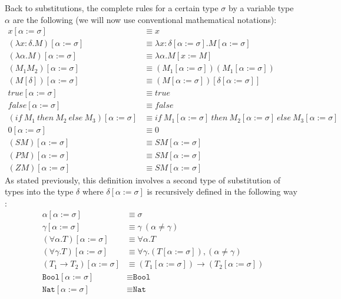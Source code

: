 \documentclass{article}
\begin{document}
    Back to substitutions, the complete rules for a certain type $\sigma$ by a variable type $\alpha$ are the following (we will now use conventional mathematical notations):
    \label{substitution2}\begin{align*}
            x[\alpha:=\sigma] &\equiv x\\
            (\lambda x : \delta .M)[\alpha:=\sigma] &\equiv \lambda x : \delta [\alpha:=\sigma] .M[\alpha:=\sigma] \\
            (\lambda \alpha .M)[\alpha:=\sigma] &\equiv \lambda \alpha .M[x:=M]\\
            (M_1 M_2)[\alpha:=\sigma] &\equiv (M_1[\alpha:=\sigma])(M_1[\alpha:=\sigma])\\
            (M [\delta])[\alpha:=\sigma] &\equiv (M[\alpha:=\sigma])[\delta[\alpha:=\sigma]]\\
            true[\alpha:=\sigma] &\equiv true\\
            false[\alpha:=\sigma] &\equiv false\\
            (if \ M_1 \ then \ M_2 \ else \ M_3)[\alpha:=\sigma] &\equiv if \ M_1[\alpha:=\sigma] \ then \ M_2[\alpha:=\sigma] \ else \ M_3[\alpha:=\sigma]\\
            0[\alpha:=\sigma] &\equiv 0\\
            (S M)[\alpha:=\sigma] &\equiv S M[\alpha:=\sigma]\\
            (P M)[\alpha:=\sigma] &\equiv S M[\alpha:=\sigma]\\
            (Z M)[\alpha:=\sigma] &\equiv S M[\alpha:=\sigma]
        \end{align*}
    As stated previously, this definition involves a second type of substitution of types into the type $\delta$ where $\delta[\alpha:=\sigma]$ is recursively defined in the following way :
    \label{substitution3}\begin{align*}
            \alpha[\alpha:=\sigma] &\equiv \sigma\\
            \gamma[\alpha:=\sigma] &\equiv \gamma \ ( \alpha\neq \gamma)\\
            (\forall \alpha .T)[\alpha:=\sigma] &\equiv \forall \alpha .T \\
            (\forall \gamma .T)[\alpha:=\sigma] &\equiv \forall \gamma .(T[\alpha:=\sigma]),  (\alpha \neq \gamma) \\
            (T_1 \rightarrow T_2)[\alpha:=\sigma] &\equiv (T_1[\alpha:=\sigma]) \rightarrow (T_2[\alpha:=\sigma])\\
            \texttt{Bool}[\alpha:=\sigma] &\equiv \texttt{Bool}\\
            \texttt{Nat}[\alpha:=\sigma] &\equiv \texttt{Nat}
        \end{align*}
\end{document}

